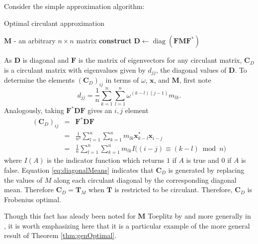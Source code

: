 \documentclass[letterpaper,12pt,oneside,final]{article}
\newcommand{\ve}[1]{\mathbf{#1}}           %
\newcommand{\m}[1]{\mathbf{#1}}               %
\newcommand{\conj}[1]{{#1}^{\ast}}
\newcommand*{\diag}{\operatorname{diag}}
\begin{document}
Consider the simple approximation algorithm:
\begin{algorithm}
  \caption{Optimal circulant approximation}
  \label{algo:circ}
  \begin{algorithmic}
    \Input
    \State$\m{M}$ - an arbitrary $n \times n$ matrix
    \EndInput
    \Statex
    \State \textbf{construct} $\m{D} \longleftarrow \diag \left ( \m{F} \m{M} \conj{\m{F}} \right )$
    \State \Return{$\m{C}_D = \conj{\m{F}} \m{D} \m{F}$}
  \end{algorithmic}
\end{algorithm}
As $\m{D}$ is diagonal and $\m{F}$ is the matrix of eigenvectors for any circulant matrix, $\m{C}_{D}$ is a circulant matrix with eigenvalues given by $d_{jj}$, the diagonal values of $\m{D}$. To determine the elements $(\m{C}_{D})_{ij}$ in terms of $\omega$, $\ve{x}$, and $\m{M}$, first note
\begin{equation} \label{eq:Dexplicit}
  d_{jj} = \frac{1}{n} \sum_{k = 1}^n \sum_{l = 1}^n \omega^{(k - l)(j - 1)} m_{lk}.
\end{equation}
Analogously, taking $\conj{\m{F}} \m{D} \m{F}$ gives an $i,j$ element
\begin{eqnarray}
  (\m{C}_D)_{ij} & = & \conj{\m{F}} \m{D} \m{F} \nonumber \\
                 & = & \frac{1}{n^2} \sum_{l = 1}^n \sum_{k = 1}^n m_{lk} \conj{\ve{x}}_{k-l} \ve{x}_{i - j} \nonumber \\
                 & = & \frac{1}{n}  \sum_{l = 1}^n \sum_{k = 1}^n m_{lk} I \big ( (i - j) \equiv (k - l) \bmod n \big ) \label{eq:diagonalMeans}
\end{eqnarray}
where $I(A)$ is the indicator function which returns $1$ if $A$ is true and $0$ if $A$ is false.
Equation \ref{eq:diagonalMeans} indicates that $\m{C}_D$ is generated by replacing the values of $M$ along each circulant diagonal by the corresponding diagonal mean. Therefore $\m{C}_D = \m{T}_M$ when $\m{T}$ is restricted to be circulant. Therefore, $\m{C}_D$ is Frobenius optimal.

Though this fact has aleady been noted for $\m{M}$ Toeplitz by \cite{chan1988optimal} and more generally in \cite{venkatapathi2021circulant}, it is worth emphasizing here that it is a particular example of the more general result of Theorem \ref{thm:genOptimal}.
\end{document}

